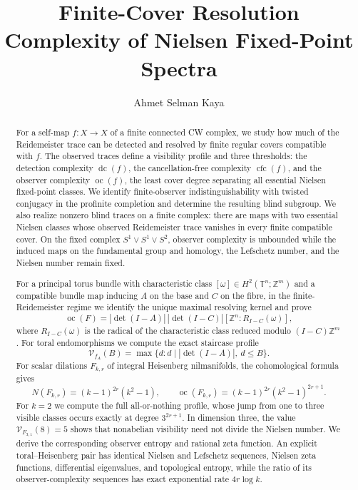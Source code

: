 \documentclass[11pt]{article}
\title{Finite-Cover Resolution Complexity of Nielsen Fixed-Point Spectra}
\author{Ahmet Selman Kaya}
\date{}
\DeclareMathOperator{\oc}{oc}
\DeclareMathOperator{\dc}{dc}
\DeclareMathOperator{\cfc}{cfc}
\newcommand{\VN}{\mathcal V}
\newcommand{\Z}{\mathbb Z}
\newcommand{\T}{\mathbb T}
\begin{document}
\maketitle

\begin{abstract}
For a self-map $f\colon X\to X$ of a finite connected CW complex, we study
how much of the Reidemeister trace can be detected and resolved by finite
regular covers compatible with $f$.  The observed traces define a visibility
profile and three thresholds: the detection complexity $\dc(f)$, the
cancellation-free complexity $\cfc(f)$, and the observer complexity $\oc(f)$,
the least cover degree separating all essential Nielsen fixed-point classes.
We identify finite-observer indistinguishability with twisted conjugacy in the
profinite completion and determine the resulting blind subgroup.  We also
realize nonzero blind traces on a finite complex: there are maps with two
essential Nielsen classes whose observed Reidemeister trace vanishes in every
finite compatible cover.  On the fixed complex $S^1\vee S^1\vee S^2$,
observer complexity is unbounded while the induced maps on the fundamental
group and homology, the Lefschetz number, and the Nielsen number remain fixed.

For a principal torus bundle with characteristic class
$[\omega]\in H^2(\T^n;\Z^m)$ and a compatible bundle map inducing $A$ on the
base and $C$ on the fibre, in the finite-Reidemeister regime we identify the
unique maximal resolving kernel and prove
\[
  \oc(F)=|\det(I-A)|\,|\det(I-C)|
  [\Z^n:R_{I-C}(\omega)],
\]
where $R_{I-C}(\omega)$ is the radical of the characteristic class reduced
modulo $(I-C)\Z^m$.  For toral endomorphisms we compute the exact staircase
profile
\[
  \VN_{f_A}(B)=\max\{d:d\mid |\det(I-A)|,\ d\le B\}.
\]
For scalar dilations $F_{k,r}$ of integral Heisenberg nilmanifolds, the
cohomological formula gives
\[
  N(F_{k,r})=(k-1)^{2r}(k^2-1),\qquad
  \oc(F_{k,r})=(k-1)^{2r}(k^2-1)^{2r+1}.
\]
For $k=2$ we compute the full all-or-nothing profile, whose jump from one to
three visible classes occurs exactly at degree $3^{2r+1}$.  In dimension
three, the value $\VN_{F_{3,1}}(8)=5$ shows that nonabelian visibility need
not divide the Nielsen number.  We derive the corresponding observer entropy
and rational zeta function.  An
explicit toral--Heisenberg pair has identical Nielsen and Lefschetz sequences,
Nielsen zeta functions, differential eigenvalues, and topological entropy,
while the ratio of its observer-complexity sequences has exact exponential
rate $4r\log k$.
\end{abstract}
\end{document}
